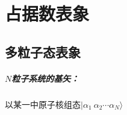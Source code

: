 \chapter{占据数表象}

\section{多粒子态表象}
\paragraph*{$N$粒子系统的基矢：}以某一中原子核组态$|\alpha_1\ \alpha_2 \cdots \alpha_N\rangle$